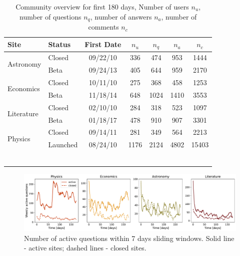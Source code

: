 \begin{table}[h]
	\centering
	\caption{Community overview for first 180 days, Number of users $n_u$, number of questions $n_q$, number of answers $n_a$, number of comments $n_c$}
	\label{tab:site-info}
	\begin{tabular}{llccccc}
		\toprule
		Site                 & Status                           & First Date                     & $n_u$                    & $n_q$                & $n_a$                  & $n_c$ \\ \hline
		\multirow{2}{*}{Astronomy}  & \multicolumn{1}{l|}{Closed}      & \multicolumn{1}{c|}{09/22/10} & \multicolumn{1}{c|}{336}  & \multicolumn{1}{c|}{474}  & \multicolumn{1}{c|}{953}  & 1444     \\
		& \multicolumn{1}{l|}{Beta} & \multicolumn{1}{c|}{09/24/13} & \multicolumn{1}{c|}{405}  & \multicolumn{1}{c|}{644}  & \multicolumn{1}{c|}{959}  & 2170     \\ \hline
		\multirow{2}{*}{Economics}  & \multicolumn{1}{l|}{Closed}      & \multicolumn{1}{c|}{10/11/10} & \multicolumn{1}{c|}{275}  & \multicolumn{1}{c|}{368}  & \multicolumn{1}{c|}{458}  & 1253     \\
		& \multicolumn{1}{l|}{Beta} & \multicolumn{1}{c|}{11/18/14} & \multicolumn{1}{c|}{648}  & \multicolumn{1}{c|}{1024} & \multicolumn{1}{c|}{1410} & 3553     \\ \hline
		\multirow{2}{*}{Literature} & \multicolumn{1}{l|}{Closed}      & \multicolumn{1}{c|}{02/10/10} & \multicolumn{1}{c|}{284}  & \multicolumn{1}{c|}{318}  & \multicolumn{1}{c|}{523}  & 1097     \\
		& \multicolumn{1}{l|}{Beta} & \multicolumn{1}{c|}{01/18/17} & \multicolumn{1}{c|}{478}  & \multicolumn{1}{c|}{910}  & \multicolumn{1}{c|}{907}  & 3301     \\ \hline
		\multirow{2}{*}{Physics}    & \multicolumn{1}{l|}{Closed}      & \multicolumn{1}{c|}{09/14/11} & \multicolumn{1}{c|}{281}  & \multicolumn{1}{c|}{349}  & \multicolumn{1}{c|}{564}  & 2213     \\
		& \multicolumn{1}{l|}{Launched}    & \multicolumn{1}{c|}{08/24/10} & \multicolumn{1}{c|}{1176} & \multicolumn{1}{c|}{2124} & \multicolumn{1}{c|}{4802} & 15403    \\
		\bottomrule \\~\\
	\end{tabular}
\end{table}


\begin{figure}
	\centering
	\includegraphics[width=\linewidth]{figures/stackexchange/active_questions.pdf}
	\caption{Number of active questions within 7 days sliding windows. Solid line - active sites; dashed lines - closed sites.}
	\label{fig:active_questions}
\end{figure}


